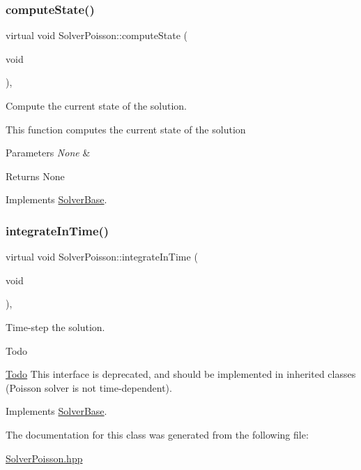 \subsubsection{\texorpdfstring{compute\+State()}{computeState()}}
{\footnotesize\ttfamily virtual void Solver\+Poisson\+::compute\+State (\begin{DoxyParamCaption}\item[{void}]{ }\end{DoxyParamCaption})\hspace{0.3cm}{\ttfamily [inline]}, {\ttfamily [virtual]}}



Compute the current state of the solution. 

This function computes the current state of the solution 
\begin{DoxyParams}{Parameters}
{\em None} & \\
\hline
\end{DoxyParams}
\begin{DoxyReturn}{Returns}
None 
\end{DoxyReturn}


Implements \mbox{\hyperlink{class_solver_base_a818006b80f29f641b6784905e1babe0f}{Solver\+Base}}.

\mbox{\label{class_solver_poisson_a4ff8a1c96b933bc01fdd411d3ae45f20}} 
\subsubsection{\texorpdfstring{integrate\+In\+Time()}{integrateInTime()}}
{\footnotesize\ttfamily virtual void Solver\+Poisson\+::integrate\+In\+Time (\begin{DoxyParamCaption}\item[{void}]{ }\end{DoxyParamCaption})\hspace{0.3cm}{\ttfamily [inline]}, {\ttfamily [virtual]}}



Time-\/step the solution. 

\begin{DoxyRefDesc}{Todo}
\item[\mbox{\hyperlink{todo__todo000013}{Todo}}]This interface is deprecated, and should be implemented in inherited classes (Poisson solver is not time-\/dependent). \end{DoxyRefDesc}


Implements \mbox{\hyperlink{class_solver_base_af2c51a926b461351926101b11cc6b60a}{Solver\+Base}}.



The documentation for this class was generated from the following file\+:\begin{DoxyCompactItemize}
\item 
\mbox{\hyperlink{_solver_poisson_8hpp}{Solver\+Poisson.\+hpp}}\end{DoxyCompactItemize}
